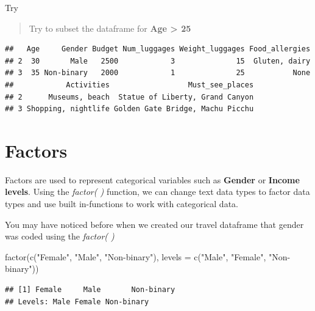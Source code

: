 \documentclass[
]{book}
\newenvironment{Shaded}{\begin{snugshade}}{\end{snugshade}}
\newcommand{\AttributeTok}[1]{\textcolor[rgb]{0.77,0.63,0.00}{#1}}
\newcommand{\DecValTok}[1]{\textcolor[rgb]{0.00,0.00,0.81}{#1}}
\newcommand{\FunctionTok}[1]{\textcolor[rgb]{0.00,0.00,0.00}{#1}}
\newcommand{\NormalTok}[1]{#1}
\newcommand{\SpecialCharTok}[1]{\textcolor[rgb]{0.00,0.00,0.00}{#1}}
\newcommand{\StringTok}[1]{\textcolor[rgb]{0.31,0.60,0.02}{#1}}
\begin{document}
Try

\begin{quote}
Try to subset the dataframe for \textbf{Age \textgreater{} 25}
\end{quote}

\begin{Shaded}
\end{Shaded}

\begin{verbatim}
##   Age     Gender Budget Num_luggages Weight_luggages Food_allergies
## 2  30       Male   2500            3              15  Gluten, dairy
## 3  35 Non-binary   2000            1              25           None
##            Activities                  Must_see_places
## 2      Museums, beach  Statue of Liberty, Grand Canyon
## 3 Shopping, nightlife Golden Gate Bridge, Machu Picchu
\end{verbatim}

\hypertarget{factors}{%
\section{Factors}\label{factors}}

Factors are used to represent categorical variables such as \textbf{Gender} or \textbf{Income levels}. Using the \emph{factor( )} function, we can change text data types to factor data types and use built in-functions to work with categorical data.

You may have noticed before when we created our travel dataframe that gender was coded using the \emph{factor( )}

\begin{Shaded}
\begin{Highlighting}[]
\FunctionTok{factor}\NormalTok{(}\FunctionTok{c}\NormalTok{(}\StringTok{"Female"}\NormalTok{, }\StringTok{"Male"}\NormalTok{, }\StringTok{"Non{-}binary"}\NormalTok{), }\AttributeTok{levels =} \FunctionTok{c}\NormalTok{(}\StringTok{"Male"}\NormalTok{, }\StringTok{"Female"}\NormalTok{, }\StringTok{"Non{-}binary"}\NormalTok{))}
\end{Highlighting}
\end{Shaded}

\begin{verbatim}
## [1] Female     Male       Non-binary
## Levels: Male Female Non-binary
\end{verbatim}
\end{document}
